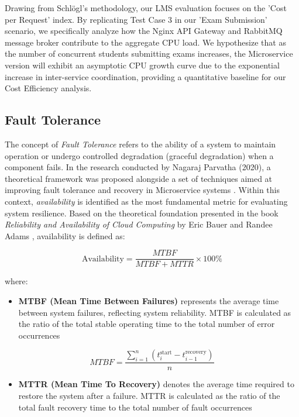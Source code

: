 Drawing from Schlögl’s methodology, our LMS evaluation focuses on the 'Cost per Request' index. By replicating Test Case 3 in our 'Exam Submission' scenario, we specifically analyze how the Nginx API Gateway and RabbitMQ message broker contribute to the aggregate CPU load. We hypothesize that as the number of concurrent students submitting exams increases, the Microservice version will exhibit an asymptotic CPU growth curve due to the exponential increase in inter-service coordination, providing a quantitative baseline for our Cost Efficiency analysis.

\subsection{Fault Tolerance}


The concept of \textit{Fault Tolerance} refers to the ability of a system to maintain operation or undergo controlled 
degradation (graceful degradation) when a component fails. In the research conducted by Nagaraj Parvatha (2020), a 
theoretical framework was proposed alongside a set of techniques aimed at improving fault tolerance and recovery in 
Microservice systems \cite{IJNRD2023}. Within this context, \textit{availability} is identified as the most 
fundamental metric for evaluating system resilience. Based on the theoretical foundation presented in 
the book \textit{Reliability and Availability of Cloud Computing} by Eric Bauer and Randee Adams \cite{bauer2012cloud}, availability is defined as:

\begin{equation}
\text{Availability} = \frac{MTBF}{MTBF + MTTR} \times 100\%
\label{eq:availability}
\end{equation}

where:

\begin{itemize}
    \item \textbf{MTBF (Mean Time Between Failures)} represents the average time between system failures, reflecting system reliability. 
    MTBF is calculated as the ratio of the total stable operating time to the total number of error occurrences
\end{itemize}

\begin{equation}
MTBF = \frac{\sum_{i=1}^{n} \left( t^{\text{start}}_i - t^{\text{recovery}}_{i-1} \right)}{n}
\label{eq:mtbf}
\end{equation}

\begin{itemize}
    \item \textbf{MTTR (Mean Time To Recovery)} denotes the average time required to restore the system after a failure. 
    MTTR is calculated as the ratio of the total fault recovery time to the total number of fault occurrences
\end{itemize}

